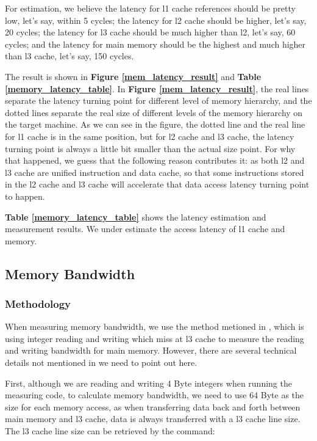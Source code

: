 For estimation, we believe the latency for l1 cache references should be pretty low, let's say, within 5 cycles; the latency for l2 cache should be higher, let's say, 20 cycles; the latency for l3 cache should be much higher than l2, let's say, 60 cycles; and the latency for main memory should be the highest and much higher than l3 cache, let's say, 150 cycles.

The result is shown in \textbf{Figure \ref{mem_latency_result}} and \textbf{Table \ref{memory_latency_table}}. In \textbf{Figure \ref{mem_latency_result}}, the real lines separate the latency turning point for different level of memory hierarchy, and the dotted lines separate the real size of different levels of the memory hierarchy on the target machine. As we can see in the figure, the dotted line and the real line for l1 cache is in the same position, but for l2 cache and l3 cache, the latency turning point is always a little bit smaller than the actual size point. For why that happened, we guess that the following reason contributes it: as both l2 and l3 cache are unified instruction and data cache, so that some instructions stored in the l2 cache and l3 cache will accelerate that data access latency turning point to happen.

\textbf{Table \ref{memory_latency_table}} shows the latency estimation and measurement results. We under estimate the access latency of l1 cache and memory.

\subsection{Memory Bandwidth}
\label{sec:memorybandwidth}
\subsubsection{Methodology}

When measuring memory bandwidth, we use the method metioned in \cite{mcvoy1996lmbench}, which is using integer reading and writing which miss at l3 cache to measure the reading and writing bandwidth for main memory. However, there are several technical details not mentioned in \cite{mcvoy1996lmbench} we need to point out here.

First, although we are reading and writing 4 Byte integers when running the measuring code, to calculate memory bandwidth, we need to use 64 Byte as the size for each memory access, as when transferring data back and forth between main memory and l3 cache, data is always transferred with a l3 cache line size. The l3 cache line size can be retrieved by the command:

